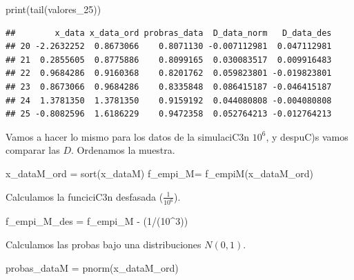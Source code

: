 \documentclass[
]{article}
\newenvironment{Shaded}{\begin{snugshade}}{\end{snugshade}}
\newcommand{\DecValTok}[1]{\textcolor[rgb]{0.00,0.00,0.81}{#1}}
\newcommand{\FunctionTok}[1]{\textcolor[rgb]{0.00,0.00,0.00}{#1}}
\newcommand{\NormalTok}[1]{#1}
\newcommand{\OtherTok}[1]{\textcolor[rgb]{0.56,0.35,0.01}{#1}}
\newcommand{\SpecialCharTok}[1]{\textcolor[rgb]{0.00,0.00,0.00}{#1}}
\begin{document}
\begin{Shaded}
\begin{Highlighting}[]
\FunctionTok{print}\NormalTok{(}\FunctionTok{tail}\NormalTok{(valores\_25))}
\end{Highlighting}
\end{Shaded}

\begin{verbatim}
##        x_data x_data_ord probras_data  D_data_norm   D_data_des
## 20 -2.2632252  0.8673066    0.8071130 -0.007112981  0.047112981
## 21  0.2855605  0.8775886    0.8099165  0.030083517  0.009916483
## 22  0.9684286  0.9160368    0.8201762  0.059823801 -0.019823801
## 23  0.8673066  0.9684286    0.8335848  0.086415187 -0.046415187
## 24  1.3781350  1.3781350    0.9159192  0.044080808 -0.004080808
## 25 -0.8082596  1.6186229    0.9472358  0.052764213 -0.012764213
\end{verbatim}

Vamos a hacer lo mismo para los datos de la simulaciC3n \(10^{6}\), y
despuC)s vamos comparar las \(D\). Ordenamos la muestra.

\begin{Shaded}
\begin{Highlighting}[]
\NormalTok{x\_dataM\_ord }\OtherTok{=} \FunctionTok{sort}\NormalTok{(x\_dataM)}
\NormalTok{f\_empi\_M}\OtherTok{=} \FunctionTok{f\_empiM}\NormalTok{(x\_dataM\_ord)}
\end{Highlighting}
\end{Shaded}

Calculamos la funciciC3n desfasada (\(\frac{1}{10^6}\)).

\begin{Shaded}
\begin{Highlighting}[]
\NormalTok{f\_empi\_M\_des }\OtherTok{=}\NormalTok{ f\_empi\_M }\SpecialCharTok{{-}}\NormalTok{ (}\DecValTok{1}\SpecialCharTok{/}\NormalTok{(}\DecValTok{10}\SpecialCharTok{\^{}}\DecValTok{3}\NormalTok{))}
\end{Highlighting}
\end{Shaded}

Calculamos las probas bajo una distribuciones \(N(0,1)\).

\begin{Shaded}
\begin{Highlighting}[]
\NormalTok{probas\_dataM }\OtherTok{=} \FunctionTok{pnorm}\NormalTok{(x\_dataM\_ord)}
\end{Highlighting}
\end{Shaded}
\end{document}

